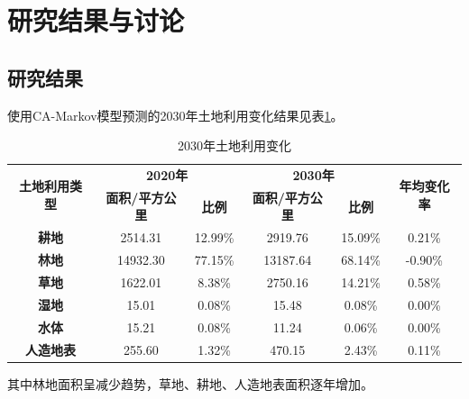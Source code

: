 \documentclass[10pt,aspectratio=169]{beamer} %
\begin{document}
	\section{研究结果与讨论}
	\subsection{研究结果}
	\begin{frame}[c]{\secname}{\subsecname}
		使用CA-Markov模型预测的2030年土地利用变化结果见表\ref{Table.3}。
		\begin{table}[htbp]
			\centering
			\caption{2030年土地利用变化}
			\begin{tabular}{cccccc}
				\toprule
				\multirow{2}[4]{*}{\textbf{土地利用类型}} &
				\multicolumn{2}{c}{\textbf{2020年}} |&
				\multicolumn{2}{c}{\textbf{2030年}} &
				\multirow{2}[4]{*}{\textbf{年均变化率}}
				\\
				\cmidrule{2-5}     &
				\textbf{面积/平方公里} &
				\textbf{比例} &
				\textbf{面积/平方公里} &
				\textbf{比例} &
				
				\\
				\midrule
				\textbf{耕地} &
				2514.31 &
				12.99\% &
				2919.76 &
				15.09\% &
				0.21\%
				\\
				\textbf{林地} &
				14932.30 &
				77.15\% &
				13187.64 &
				68.14\% &
				-0.90\%
				\\
				\textbf{草地} &
				1622.01 &
				8.38\% &
				2750.16 &
				14.21\% &
				0.58\%
				\\
				\textbf{湿地} &
				15.01 &
				0.08\% &
				15.48 &
				0.08\% &
				0.00\%
				\\
				\textbf{水体} &
				15.21 &
				0.08\% &
				11.24 &
				0.06\% &
				0.00\%
				\\
				\textbf{人造地表} &
				255.60 &
				1.32\% &
				470.15 &
				2.43\% &
				0.11\%
				\\
				\bottomrule
			\end{tabular}%
			\label{Table.3}%
		\end{table}%
		其中林地面积呈减少趋势，草地、耕地、人造地表面积逐年增加。		
	\end{frame}
\end{document}
